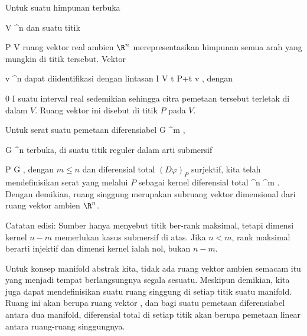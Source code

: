 \setcounter{section}{9}


Untuk suatu himpunan terbuka

\mavergleichskette
{\vergleichskette
{V
}
{ \subseteq }{ \R^n
}
{  }{
}
{    }{
}
{   }{
}
}
{}{}{}
dan suatu titik

\mavergleichskette
{\vergleichskette
{P
}
{ \in }{V
}
{  }{
}
{    }{
}
{   }{
}
}
{}{}{}
ruang vektor real ambien $\R^n$ merepresentasikan himpunan semua arah yang mungkin di titik tersebut. Vektor

\mavergleichskette
{\vergleichskette
{v
}
{ \in }{ \R^n
}
{  }{
}
{    }{
}
{   }{
}
}
{}{}{}
dapat diidentifikasi dengan lintasan
\maabbeledisp {} {I} {V
} {t} { P+t v
} {,}
dengan

\mavergleichskette
{\vergleichskette
{ 0
}
{ \in }{ I
}
{  }{
}
{    }{
}
{   }{
}
}
{}{}{}
suatu interval real sedemikian sehingga citra pemetaan tersebut terletak di dalam $V$. Ruang vektor ini disebut  {} di titik $P$ pada $V$.

Untuk serat suatu pemetaan diferensiabel
\maabb {\varphi} {G} {\R^m
} {,}

\mavergleichskette
{\vergleichskette
{G
}
{ \subseteq }{ \R^n
}
{  }{
}
{    }{
}
{   }{
}
}
{}{}{}
terbuka, di suatu titik reguler dalam arti submersif

\mavergleichskette
{\vergleichskette
{P
}
{ \in }{G
}
{  }{
}
{    }{
}
{   }{
}
}
{}{}{}, dengan $m\leq n$ dan diferensial total $(D\varphi)_P$ surjektif, kita telah mendefinisikan
serat yang melalui $P$ sebagai kernel diferensial total
 {\R^n } { \R^m
} {}.
Dengan demikian, ruang singgung merupakan subruang vektor
dimensional dari ruang vektor ambien $\R^n$.

Catatan edisi: Sumber hanya menyebut titik ber-rank maksimal, tetapi dimensi kernel $n-m$ memerlukan kasus submersif di atas. Jika $n<m$, rank maksimal berarti injektif dan dimensi kernel ialah nol, bukan $n-m$.

Untuk konsep manifold abstrak kita, tidak ada ruang vektor ambien semacam itu yang menjadi tempat berlangsungnya segala sesuatu. Meskipun demikian, kita juga dapat mendefinisikan suatu ruang singgung di setiap titik suatu manifold. Ruang ini akan berupa ruang vektor
 {} {,}
dan bagi suatu pemetaan diferensiabel antara dua manifold, diferensial total di setiap titik akan berupa pemetaan linear antara ruang-ruang singgungnya.

